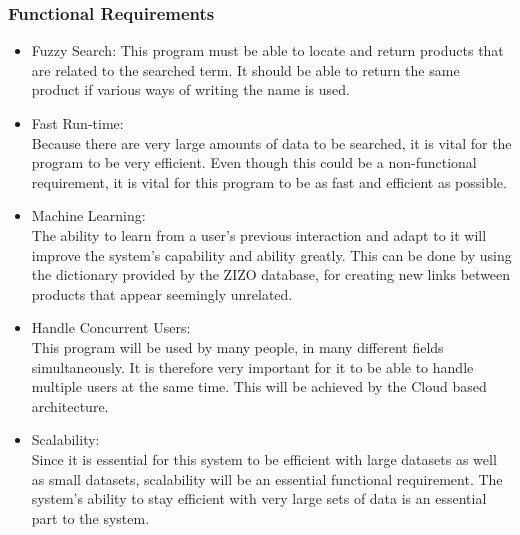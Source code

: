 \documentclass[a4paper,10pt]{article}
\begin{document}
	\subsubsection{Functional Requirements} 
		\begin{itemize}
		\item Fuzzy Search: This program must be able to locate and return products that are related to the searched term. It should be able to return the same product if various ways of writing the name is used.
	
		\item Fast Run-time:\\
			Because there are very large amounts of data to be searched, it is vital for the program to be very efficient.  Even though this could be a non-functional requirement, it is vital for this program to be as fast and efficient as possible.
			
		\item Machine Learning:\\
			The ability to learn from a user's previous interaction and adapt to it will improve the system’s capability and ability greatly. This can be done by using the dictionary provided by the ZIZO database, for creating new links between products that appear seemingly unrelated.\\
	
		\item Handle Concurrent Users:\\
			This program will be used by many people, in many different fields simultaneously. It is therefore very important for it to be able to handle multiple users at the same time. This will be achieved by the Cloud based architecture.
	
		\item Scalability:\\
			Since it is essential for this system to be efficient with large datasets as well as small datasets, scalability will be an essential functional requirement. The system’s ability to stay efficient with very large sets of data is an essential part to the system.
		 \end{itemize}
\end{document}
